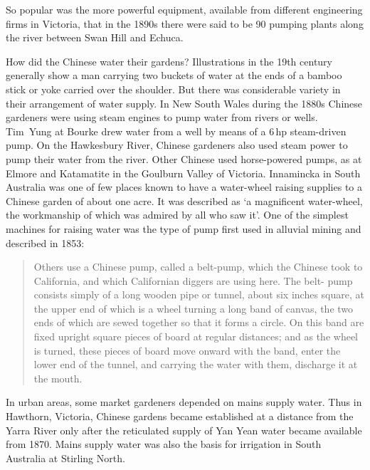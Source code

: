 So popular was the more powerful equipment, available from different
engineering firms in Victoria, that in the 1890s there were said to be
90 pumping plants along the river between Swan Hill and
Echuca.

How did the Chinese water their gardens?  Illustrations in the 19th
century generally show a man carrying two buckets of water at the ends
of a bamboo stick or yoke carried over the shoulder.  But there was
considerable variety in their arrangement of water supply.  In New
South Wales during the 1880s Chinese gardeners were using steam
engines to pump water from rivers or wells.  Tim~Yung at Bourke drew
water from a well by means of a 6\,hp steam-driven pump.  On the
Hawkesbury River, Chinese gardeners also used steam power to pump
their water from the river.  Other Chinese used horse-powered pumps,
as at Elmore and Katamatite in the Goulburn Valley of
Victoria.  Innamincka in South Australia
was one of few places known to have a water-wheel raising supplies to
a Chinese garden of about one acre.  It was described as `a
magnificent water-wheel, the workmanship of which was admired by all
who saw it'.  One of the simplest
machines for raising water was the type of pump first used in alluvial
mining and described in 1853:
\begin{quote}	
	Others use a Chinese pump, called a belt-pump, which the
	Chinese took to California, and which Californian diggers are
	using here.  The belt- pump consists simply of a long wooden
	pipe or tunnel, about six inches square, at the upper end of
	which is a wheel turning a long band of canvas, the two ends
	of which are sewed together so that it forms a circle.  On
	this band are fixed upright square pieces of board at regular
	distances; and as the wheel is turned, these pieces of board
	move onward with the band, enter the lower end of the tunnel,
	and carrying the water with them, discharge it at the
	mouth.
\end{quote}

In urban areas, some market gardeners depended on mains supply water.
Thus in Hawthorn, Victoria, Chinese gardens became established at a
distance from the Yarra River only after the reticulated supply of Yan
Yean water became available from 1870.  Mains supply water was
also the basis for irrigation in South Australia at Stirling
North.

